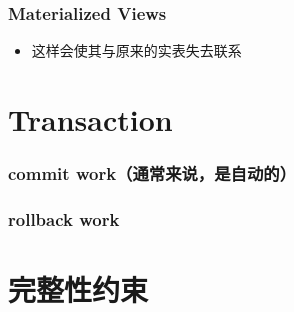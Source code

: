 \documentclass[UTF8]{article}
\begin{document}
  
  \section{Materialized Views}%
  \label{sec:materialized_views}
  \begin{itemize}
    \item 这样会使其与原来的实表失去联系
  \end{itemize}

  
  \part{Transaction}%
  \label{prt:transaction}

  \section{commit work（通常来说，是自动的）}%
  \label{sec:commit_work_通常来说_是自动的_}
  
  \section{rollback work}%
  \label{sec:rollback_work}
  
  \part{完整性约束}%
  \label{prt:完整性约束}
  
  
  
  
  
  
  
  
  
  
  

  
  
\end{document}
